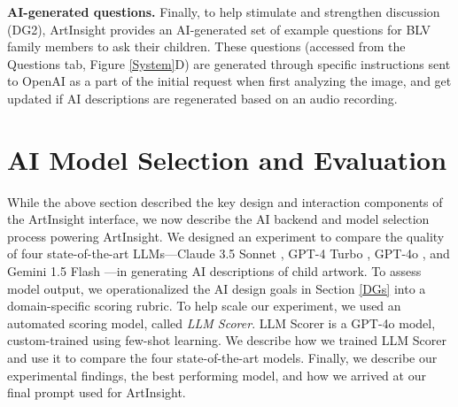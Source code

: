 \documentclass[sigconf]{acmart}
\begin{document}
\textbf{AI-generated questions.} Finally, to help stimulate and strengthen discussion (DG2), ArtInsight provides an AI-generated set of example questions for BLV family members to ask their children. These questions (accessed from the Questions tab, Figure \ref{System}D) are generated through specific instructions sent to OpenAI as a part of the initial request when first analyzing the image, and get updated if AI descriptions are regenerated based on an audio recording.

\section{AI Model Selection and Evaluation}
\label{AIBackend}

While the above section described the key design and interaction components of the ArtInsight interface, we now describe the AI backend and model selection process powering ArtInsight. We designed an experiment to compare the quality of four state-of-the-art LLMs---Claude 3.5 Sonnet \cite{Claude35}, GPT-4 Turbo \cite{GPT-4Turbo}, GPT-4o \cite{GPT-4o}, and Gemini 1.5 Flash \cite{Gemini}---in generating AI descriptions of child artwork. To assess model output, we operationalized the AI design goals in Section \ref{DGs} into a domain-specific scoring rubric. To help scale our experiment, we used an automated scoring model, called \textit{LLM Scorer}. LLM Scorer is a GPT-4o \cite{GPT-4o} model, custom-trained using few-shot learning. We describe how we trained LLM Scorer and use it to compare the four state-of-the-art models. Finally, we describe our experimental findings, the best performing model, and how we arrived at our final prompt used for ArtInsight.
\end{document}
